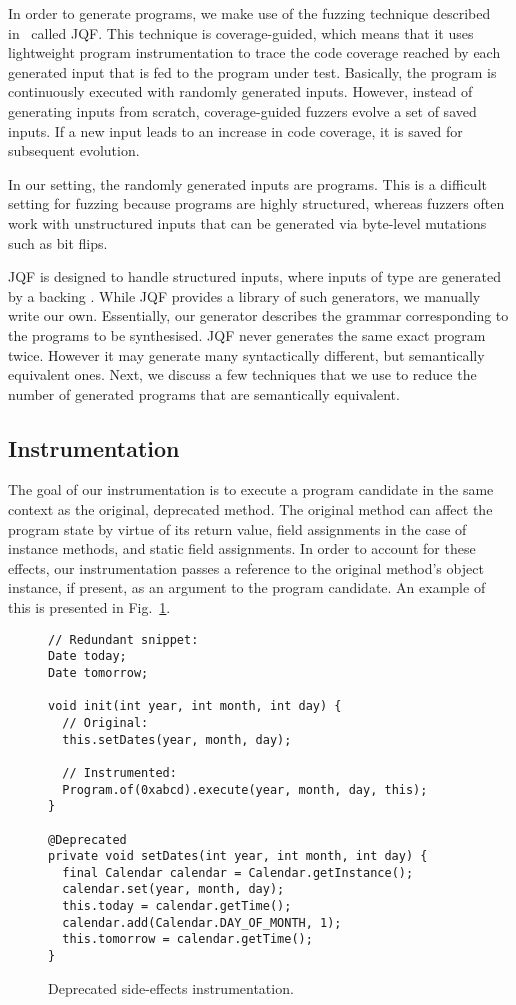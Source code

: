 \documentclass[runningheads,a4paper]{llncs}
\begin{document}
In order to generate programs, we make use of the fuzzing technique described
in~\cite{DBLP:conf/issta/PadhyeLS19} called JQF.  This technique is
coverage-guided, which means that it uses lightweight program
instrumentation to trace the code coverage reached by each generated
input that is fed to the program under test.  Basically, the program
is continuously executed with randomly generated inputs. However,
instead of generating inputs from scratch, coverage-guided fuzzers
evolve a set of saved inputs. If a new input leads to an increase
in code coverage, it is saved for subsequent evolution.

In our setting, the randomly generated inputs are programs.
This is a difficult setting for fuzzing because programs are
highly structured, whereas fuzzers often work with unstructured inputs
that can be generated via byte-level mutations such as bit flips.

JQF is designed to handle structured inputs, where inputs of type 
are generated by a backing .
While JQF provides a library of such generators, we manually write our own.
Essentially, our generator describes the grammar corresponding to the
programs to be synthesised.
JQF never generates the same exact program twice. However it may generate many
syntactically different, but semantically equivalent ones.
Next, we discuss a few techniques that we use to reduce the number of
generated programs that are semantically equivalent.


\subsection{Instrumentation}

The goal of our instrumentation is to execute a program candidate in
the same context as the original, deprecated method. The original
method can affect the program state by virtue of its return value,
field assignments in the case of instance methods, and static field
assignments. In order to account for these effects, our
instrumentation passes a reference to the original method's object
instance, if present, as an argument to the program candidate.
An example of this is presented in
Fig.~\ref{ex:side-effects-instrumentation}.

\begin{figure}
\begin{lstlisting}[mathescape=true,showstringspaces=false]
// Redundant snippet:
Date today;
Date tomorrow;
  
void init(int year, int month, int day) {
  // Original:
  this.setDates(year, month, day);

  // Instrumented:
  Program.of(0xabcd).execute(year, month, day, this);
}
  
@Deprecated
private void setDates(int year, int month, int day) {
  final Calendar calendar = Calendar.getInstance();
  calendar.set(year, month, day);
  this.today = calendar.getTime();
  calendar.add(Calendar.DAY_OF_MONTH, 1);
  this.tomorrow = calendar.getTime();
}
\end{lstlisting}
\caption{Deprecated side-effects instrumentation.}
\label{ex:side-effects-instrumentation}
\end{figure}
\end{document}
